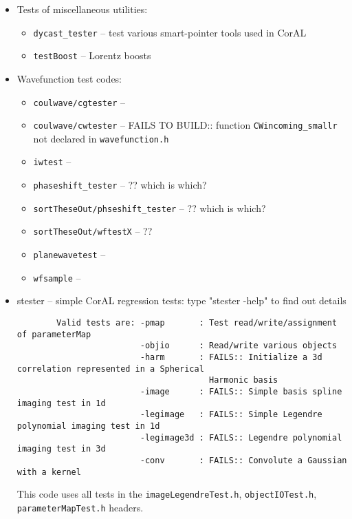 \documentclass[10pt]{article}
\begin{document}
\begin{itemize}
	\item Tests of miscellaneous utilities:

    	\begin{itemize}
    		\item \texttt{dycast\_tester} -- test various smart-pointer tools used in CorAL
    		\item \texttt{testBoost} -- Lorentz boosts
    	\end{itemize}


	\item Wavefunction test codes:

    	\begin{itemize}
    		\item \texttt{coulwave/cgtester} -- 
    		\item \texttt{coulwave/cwtester} -- FAILS TO BUILD:: function \texttt{CWincoming\_smallr} not declared in \texttt{wavefunction.h}
            \item \texttt{iwtest} -- 
            \item \texttt{phaseshift\_tester} -- ?? which is which?
            \item \texttt{sortTheseOut/phseshift\_tester} -- ?? which is which?
            \item \texttt{sortTheseOut/wftestX} -- ?? 
            \item \texttt{planewavetest} -- 
    		\item \texttt{wfsample} -- 
    	\end{itemize}


	\item stester -- simple CorAL regression tests: type "stester -help" to find out details

		\begin{verbatim}
        Valid tests are: -pmap       : Test read/write/assignment of parameterMap
                         -objio      : Read/write various objects
                         -harm       : FAILS:: Initialize a 3d correlation represented in a Spherical 
                                       Harmonic basis
                         -image      : FAILS:: Simple basis spline imaging test in 1d
                         -legimage   : FAILS:: Simple Legendre polynomial imaging test in 1d
                         -legimage3d : FAILS:: Legendre polynomial imaging test in 3d
                         -conv       : FAILS:: Convolute a Gaussian with a kernel
		\end{verbatim}
        This code uses all tests in the \texttt{imageLegendreTest.h}, \texttt{objectIOTest.h}, \texttt{parameterMapTest.h} headers.


\end{itemize}
\end{document}
